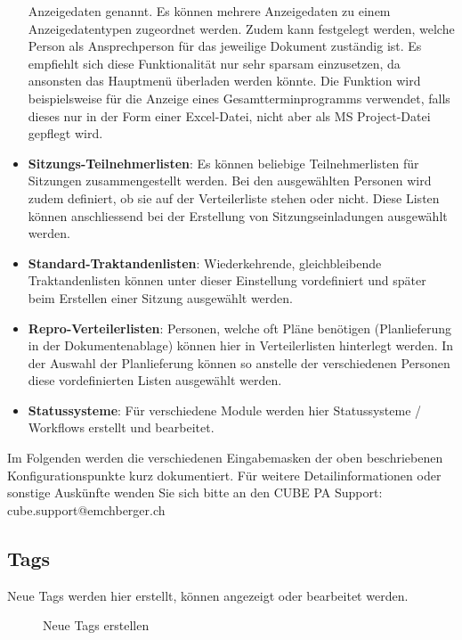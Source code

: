 \begin{itemize}
Anzeigedaten genannt. Es können mehrere Anzeigedaten zu einem Anzeigedatentypen zugeordnet werden. Zudem kann festgelegt werden, welche Person als Ansprechperson für das jeweilige Dokument zuständig ist. Es empfiehlt sich diese Funktionalität nur sehr sparsam einzusetzen, da ansonsten das Hauptmenü überladen werden könnte. Die Funktion wird beispielsweise für die Anzeige eines Gesamtterminprogramms verwendet, falls dieses nur in der Form einer Excel-Datei, nicht aber als MS Project-Datei gepflegt wird.
\item
\textbf{Sitzungs-Teilnehmerlisten}: Es können beliebige Teilnehmerlisten für Sitzungen zusammengestellt werden. Bei den ausgewählten Personen wird zudem definiert, ob sie auf der Verteilerliste stehen oder nicht. Diese Listen können anschliessend bei der Erstellung von Sitzungseinladungen ausgewählt werden.
\item
\textbf{Standard-Traktandenlisten}: Wiederkehrende, gleichbleibende Traktandenlisten können unter dieser Einstellung vordefiniert und später beim Erstellen einer Sitzung ausgewählt werden.
\item
\textbf{Repro-Verteilerlisten}: Personen, welche oft Pläne benötigen (Planlieferung in der Dokumentenablage) können hier in Verteilerlisten hinterlegt werden. In der Auswahl der Planlieferung können so anstelle der verschiedenen Personen diese vordefinierten Listen ausgewählt werden.
\item
\textbf{Statussysteme}: Für verschiedene Module werden hier Statussysteme / Workflows erstellt und bearbeitet.
\end{itemize}

\vspace{\baselineskip}

Im Folgenden werden die verschiedenen Eingabemasken der oben beschriebenen Konfigurationspunkte kurz dokumentiert. Für weitere Detailinformationen oder sonstige Auskünfte wenden Sie sich bitte an den CUBE PA Support: {\color{red} cube.support@emchberger.ch}

\subsection{Tags}

Neue Tags werden hier erstellt, können angezeigt oder bearbeitet werden.

\begin{figure}[H]
\caption{Neue Tags erstellen}
\end{figure}

